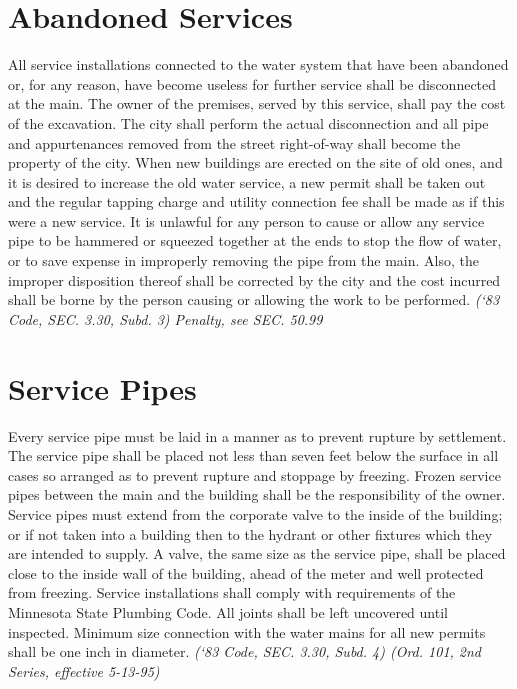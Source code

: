 \section{Abandoned Services}
All service installations connected to the water system that have been abandoned or, for any reason, have become useless for further service shall be disconnected at the main.  The owner of the premises, served by this service, shall pay the cost of the excavation.  The city shall perform the actual disconnection and all pipe and appurtenances removed from the street right-of-way shall become the property of the city.  When new buildings are erected on the site of old ones, and it is desired to increase the old water service, a new permit shall be taken out and the regular tapping charge and utility connection fee shall be made as if this were a new service.  It is unlawful for any person to cause or allow any service pipe to be hammered or squeezed together at the ends to stop the flow of water, or to save expense in improperly removing the pipe from the main.  Also, the improper disposition thereof shall be corrected by the city and the cost incurred shall be borne by the person causing or allowing the work to be performed.\newline
\emph{(‘83 Code, SEC. 3.30, Subd. 3)  Penalty, see SEC. 50.99}
\section{Service Pipes}
Every service pipe must be laid in a manner as to prevent rupture by settlement.  The service pipe shall be placed not less than seven feet below the surface in all cases so arranged as to prevent rupture and stoppage by freezing.  Frozen service pipes between the main and the building shall be the responsibility of the owner.  Service pipes must extend from the corporate valve to the inside of the building; or if not taken into a building then to the hydrant or other fixtures which they are intended to supply.  A valve, the same size as the service pipe, shall be placed close to the inside wall of the building, ahead of the meter and well protected from freezing.  Service installations shall comply with requirements of the Minnesota State Plumbing Code.  All joints shall be left uncovered until inspected.  Minimum size connection with the water mains for all new permits shall be one inch in diameter.\newline
\emph{(‘83 Code, SEC. 3.30, Subd. 4) (Ord. 101, 2nd Series, effective 5-13-95)}
